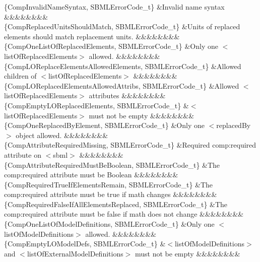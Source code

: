 \begin{DoxyParagraph}{}
\begin{longtabu}
\{Comp\+Invalid\+Name\+Syntax, S\+B\+M\+L\+Error\+Code\+\_\+t\} &Invalid name syntax &&&&&&&&\\
\{Comp\+Replaced\+Units\+Should\+Match, S\+B\+M\+L\+Error\+Code\+\_\+t\} &Units of replaced elements should match replacement units. &&&&&&&&\\
\{Comp\+One\+List\+Of\+Replaced\+Elements, S\+B\+M\+L\+Error\+Code\+\_\+t\} &Only one {\ttfamily $<$list\+Of\+Replaced\+Elements$>$} allowed. &&&&&&&&\\
\{Comp\+L\+O\+Replace\+Elements\+Allowed\+Elements, S\+B\+M\+L\+Error\+Code\+\_\+t\} &Allowed children of {\ttfamily $<$list\+Of\+Replaced\+Elements$>$} &&&&&&&&\\
\{Comp\+L\+O\+Replaced\+Elements\+Allowed\+Attribs, S\+B\+M\+L\+Error\+Code\+\_\+t\} &Allowed {\ttfamily $<$list\+Of\+Replaced\+Elements$>$} attributes &&&&&&&&\\
\{Comp\+Empty\+L\+O\+Replaced\+Elements, S\+B\+M\+L\+Error\+Code\+\_\+t\} &{\ttfamily $<$list\+Of\+Replaced\+Elements$>$} must not be empty &&&&&&&&\\
\{Comp\+One\+Replaced\+By\+Element, S\+B\+M\+L\+Error\+Code\+\_\+t\} &Only one {\ttfamily $<$replaced\+By$>$} object allowed. &&&&&&&&\\
\{Comp\+Attribute\+Required\+Missing, S\+B\+M\+L\+Error\+Code\+\_\+t\} &Required comp\+:required attribute on {\ttfamily $<$sbml$>$} &&&&&&&&\\
\{Comp\+Attribute\+Required\+Must\+Be\+Boolean, S\+B\+M\+L\+Error\+Code\+\_\+t\} &The comp\+:required attribute must be Boolean &&&&&&&&\\
\{Comp\+Required\+True\+If\+Elements\+Remain, S\+B\+M\+L\+Error\+Code\+\_\+t\} &The comp\+:required attribute must be \textquotesingle{}true\textquotesingle{} if math changes &&&&&&&&\\
\{Comp\+Required\+False\+If\+All\+Elements\+Replaced, S\+B\+M\+L\+Error\+Code\+\_\+t\} &The comp\+:required attribute must be \textquotesingle{}false\textquotesingle{} if math does not change &&&&&&&&\\
\{Comp\+One\+List\+Of\+Model\+Definitions, S\+B\+M\+L\+Error\+Code\+\_\+t\} &Only one {\ttfamily $<$list\+Of\+Model\+Definitions$>$} allowed. &&&&&&&&\\
\{Comp\+Empty\+L\+O\+Model\+Defs, S\+B\+M\+L\+Error\+Code\+\_\+t\} &{\ttfamily $<$list\+Of\+Model\+Definitions$>$} and {\ttfamily $<$list\+Of\+External\+Model\+Definitions$>$} must not be empty &&&&&&&&\\

\end{longtabu}
\end{DoxyParagraph}

